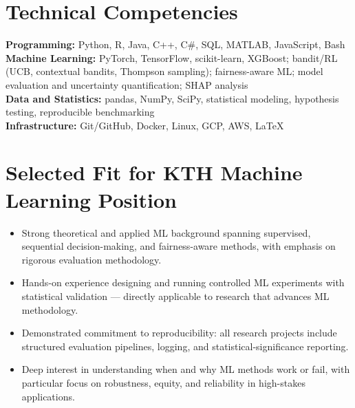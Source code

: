 \documentclass[11pt]{article}
\begin{document}
\section{Technical Competencies}
\textbf{Programming:} Python, R, Java, C++, C\#, SQL, MATLAB, JavaScript, Bash\\
\textbf{Machine Learning:} PyTorch, TensorFlow, scikit-learn, XGBoost; bandit/RL (UCB, contextual bandits, Thompson sampling); fairness-aware ML; model evaluation and uncertainty quantification; SHAP analysis\\
\textbf{Data and Statistics:} pandas, NumPy, SciPy, statistical modeling, hypothesis testing, reproducible benchmarking\\
\textbf{Infrastructure:} Git/GitHub, Docker, Linux, GCP, AWS, LaTeX

\section{Selected Fit for KTH Machine Learning Position}
\begin{itemize}
  \item Strong theoretical and applied ML background spanning supervised, sequential decision-making, and fairness-aware methods, with emphasis on rigorous evaluation methodology.
  \item Hands-on experience designing and running controlled ML experiments with statistical validation --- directly applicable to research that advances ML methodology.
  \item Demonstrated commitment to reproducibility: all research projects include structured evaluation pipelines, logging, and statistical-significance reporting.
  \item Deep interest in understanding when and why ML methods work or fail, with particular focus on robustness, equity, and reliability in high-stakes applications.
\end{itemize}
\end{document}
